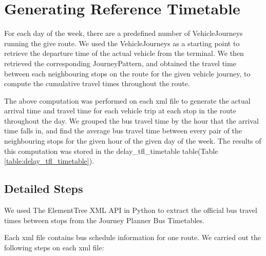 \section{Generating Reference Timetable}
\label{sec: official_tfl_timetable}

For each day of the week, there are a predefined number of VehicleJourneys running the give route. We used the VehicleJourneys as a starting point to retrieve the departure time of the actual vehicle from the terminal. We then retrieved the corresponding JourneyPattern, and obtained the travel time between each neighbouring stops on the route for the given vehicle journey, to compute the cumulative travel times throughout the route.

The above computation was performed on each xml file to generate the actual arrival time and travel time for each vehicle trip at each stop in the route throughout the day. We grouped the bus travel time by the hour that the arrival time falls in, and find the average bus travel time between every pair of the neighbouring stops for the given hour of the given day of the week. The results of this computation was stored in the delay\_tfl\_timetable table(Table \ref{table:delay_tfl_timetable}).

\subsection{Detailed Steps}

\par We used The ElementTree XML API in Python \cite{elementtree} to extract the official bus travel times between stops from the Journey Planner Bus Timetables\cite{open_data_feeds_description}.

\par Each \acrshort{xml} file contains bus schedule information for one route. We carried out the following steps on each \acrshort{xml} file:

